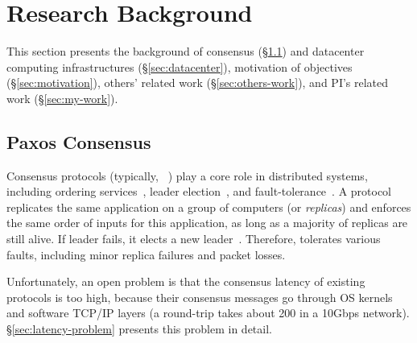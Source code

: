 \vspace{-.15in}\section{Research Background} 
\label{sec:background}\vspace{-.075in}

This section presents the background of consensus (\S\ref{sec:consensus}) and 
datacenter computing infrastructures (\S\ref{sec:datacenter}), motivation of 
objectives (\S\ref{sec:motivation}), others' related work 
(\S\ref{sec:others-work}), and PI's related work (\S\ref{sec:my-work}).

\vspace{-.15in}\subsection{Paxos Consensus} 
\label{sec:consensus}\vspace{-.075in}

Consensus protocols (typically, 
\paxos~\cite{paxos:practical,paxos,paxos:simple,paxos:complex}) play a 
core role in distributed systems, including ordering 
services~\cite{ellis:thesis,manos:hotdep10,scatter:sosp11},
leader election~\cite{zookeeper, chubby:osdi}, and
fault-tolerance~\cite{eve:osdi12,rex:eurosys14,crane:sosp15}. A \paxos protocol
replicates the same application on a group of computers (or \emph{replicas}) 
and enforces the same order of inputs for this application, as long as 
a majority of replicas are still alive. If leader fails, it elects a new 
leader~\cite{paxos:practical}. Therefore, \paxos tolerates 
various faults, including minor replica failures and packet losses. 


Unfortunately, an open problem is that the consensus latency of existing 
\paxos protocols is too high, because their consensus messages go through OS 
kernels and software TCP/IP layers (a  round-trip takes about 200 \us 
in a 10Gbps network). \S\ref{sec:latency-problem} presents this problem in 
detail.

